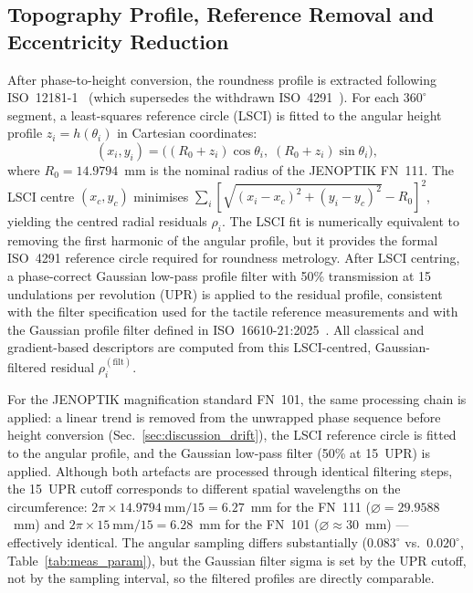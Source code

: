 \documentclass[review]{elsarticle}
\begin{document}
\subsection{Topography Profile, Reference Removal and Eccentricity Reduction}
\label{sec:topography}
After phase-to-height conversion, the roundness profile is extracted following ISO~12181-1~\cite{ISO12181-1} (which supersedes the withdrawn ISO~4291~\cite{ISO4291}). For each $360^\circ$ segment, a least-squares reference circle (LSCI) is fitted to the angular height profile $z_i = h(\theta_i)$ in Cartesian coordinates:
\begin{equation}
(x_i, y_i) = \big((R_0 + z_i)\cos\theta_i,\; (R_0 + z_i)\sin\theta_i\big),
\end{equation}
where $R_0 = 14.9794$~mm is the nominal radius of the JENOPTIK FN~111. The LSCI centre $(x_c, y_c)$ minimises $\sum_i [\sqrt{(x_i-x_c)^2+(y_i-y_c)^2} - R_0]^2$, yielding the centred radial residuals $\rho_i$. The LSCI fit is numerically equivalent to removing the first harmonic of the angular profile, but it provides the formal ISO~4291 reference circle required for roundness metrology. After LSCI centring, a phase-correct Gaussian low-pass profile filter with 50\% transmission at 15 undulations per revolution (UPR) is applied to the residual profile, consistent with the filter specification used for the tactile reference measurements and with the Gaussian profile filter defined in ISO~16610-21:2025~\cite{ISO16610-21}. All classical and gradient-based descriptors are computed from this LSCI-centred, Gaussian-filtered residual $\rho_i^{(\mathrm{filt})}$.

For the JENOPTIK magnification standard FN~101, the same processing chain is applied: a linear trend is removed from the unwrapped phase sequence before height conversion (Sec.~\ref{sec:discussion_drift}), the LSCI reference circle is fitted to the angular profile, and the Gaussian low-pass filter (50\% at 15~UPR) is applied. Although both artefacts are processed through identical filtering steps, the 15~UPR cutoff corresponds to different spatial wavelengths on the circumference: $2\pi \times 14.9794~\mathrm{mm}/15 = 6.27$~mm for the FN~111 ($\varnothing=29.9588$~mm) and $2\pi \times 15~\mathrm{mm}/15 = 6.28$~mm for the FN~101 ($\varnothing \approx 30$~mm) — effectively identical. The angular sampling differs substantially ($0.083^\circ$ vs.\ $0.020^\circ$, Table~\ref{tab:meas_param}), but the Gaussian filter sigma is set by the UPR cutoff, not by the sampling interval, so the filtered profiles are directly comparable.
\end{document}
